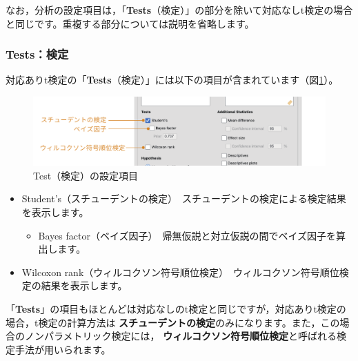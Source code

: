\documentclass[
  12pt,
  a5jpaper,
  lualatex, ja=standard]{bxjsbook}
\providecommand{\tightlist}{%
  \setlength{\itemsep}{0pt}\setlength{\parskip}{0pt}}
\renewcommand{\emph}[1]{\textbf{\color{emph} #1}}
\newenvironment{jmvsettings}{%
	\begin{center}%
	\begin{tcolorbox}[%
		title=設定項目,
		colframe=gmoji,
		colbacktitle=gmoji,
		colback=gmoji!2!white,
		breakable,
		width=.9\textwidth,
		]\small\addtolength{\leftmargini}{-3\labelsep}%
	}%
	{\end{tcolorbox}\end{center}}
\begin{document}
なお，分析の設定項目は，「\textbf{Tests}（検定）」の部分を除いて対応なしt検定の場合と同じです。重複する部分については説明を省略します。

\hypertarget{subsub:ttest-test}{%
\subsubsection*{Tests：検定}\label{subsub:ttest-test}}

対応ありt検定の「\textbf{Tests}（検定）」には以下の項目が含まれています（図\ref{fig:ttests-paired-test}）。

\begin{figure}[!ht]

{\centering \includegraphics[width=1\linewidth]{images/ttests/paired-test} 

}

\caption{Test（検定）の設定項目}\label{fig:ttests-paired-test}
\end{figure}

\begin{jmvsettings}

\begin{itemize}
\tightlist
\item
  Student's（スチューデントの検定）　スチューデントの検定による検定結果を表示します。

  \begin{itemize}
  \tightlist
  \item
    Bayes factor（ベイズ因子）　帰無仮説と対立仮説の間でベイズ因子を算出します。
  \end{itemize}
\item
  Wilcoxon rank（ウィルコクソン符号順位検定）　ウィルコクソン符号順位検定の結果を表示します。
\end{itemize}

\end{jmvsettings}

「\textbf{Tests}」の項目もほとんどは対応なしのt検定と同じですが，対応ありt検定の場合，t検定の計算方法は\emph{スチューデントの検定}のみになります。また，この場合のノンパラメトリック検定には，\emph{ウィルコクソン符号順位検定}と呼ばれる検定手法が用いられます。
\end{document}
